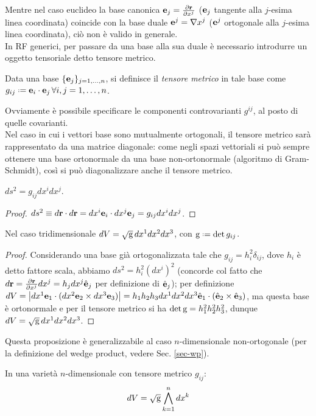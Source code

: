 Mentre nel caso euclideo la base canonica $ \mathbf{e}_j = \frac{\partial \mathbf{r}}{\partial x^j} $ ($ \mathbf{e}_j $ tangente alla $ j $-esima linea coordinata) coincide con la base duale $ \mathbf{e}^j = \nabla x^j $ ($ \mathbf{e}^j $ ortogonale alla $ j $-esima linea coordinata), ciò non è valido in generale.\\
In RF generici, per passare da una base alla sua duale è necessario introdurre un oggetto tensoriale detto tensore metrico.

\begin{definition}
	Data una base $ \{\mathbf{e}_j\}_{j=1,\dots,n} $, si definisce il \textit{tensore metrico} in tale base come $ g_{ij} \defeq \ve{e}_i \cdot \ve{e}_j \, \forall i,j = 1,\dots,n$.
\end{definition}

Ovviamente è possibile specificare le componenti controvarianti $ g^{ij} $, al posto di quelle covarianti. \\
Nel caso in cui i vettori base sono mutualmente ortogonali, il tensore metrico sarà rappresentato da una matrice diagonale: come negli spazi vettoriali si può sempre ottenere una base ortonormale da una base non-ortonormale (algoritmo di Gram-Schmidt), così si può diagonalizzare anche il tensore metrico.

\begin{proposition}
	$ ds^2 = g_{ij} dx^i dx^j $.
\end{proposition}
\begin{proof}
	$ ds^2 \equiv d\mathbf{r} \cdot d\mathbf{r} = dx^i \mathbf{e}_i \cdot dx^j \mathbf{e}_j = g_{ij} dx^i dx^j $.
\end{proof}

\begin{proposition}
	Nel caso tridimensionale $ dV = \sqrt{\mathrm{g}}\, dx^1 dx^2 dx^3 $, con $ \tens{g} \defeq \det g_{ij} $.
\end{proposition}
\begin{proof}
	Considerando una base già ortogonalizzata tale che $ g_{ij} = h_i^2 \delta_{ij} $, dove $ h_i $ è detto fattore scala, abbiamo $ ds^2 = h_i^2 (dx^i)^2 $ (concorde col fatto che $ d\mathbf{r} = \frac{\partial \mathbf{r}}{\partial x^j} dx^j = h_j dx^j \hat{\mathbf{e}}_j $ per definizione di $ \hat{\mathbf{e}}_j $); per definizione $ dV = \left\lvert dx^1\mathbf{e}_1 \cdot (dx^2\mathbf{e}_2 \times dx^3\mathbf{e}_3)\right\rvert = h_1 h_2 h_3 dx^1 dx^2 dx^3 \hat{\mathbf{e}}_1 \cdot (\hat{\mathbf{e}}_2 \times \hat{\mathbf{e}}_3) $, ma questa base è ortonormale e per il tensore metrico si ha $ \det\mathrm{g} = h_1^2 h_2^2 h_3^2 $, dunque $ dV = \sqrt{\mathrm{g}}\, dx^1 dx^2 dx^3 $.
\end{proof}
Questa proposizione è generalizzabile al caso $ n $-dimensionale non-ortogonale (per la definizione del wedge product, vedere Sec. \ref{sec-wp}).
\begin{proposition}
	In una varietà $ n $-dimensionale con tensore metrico $ g_{ij} $:
	\begin{equation}
		dV = \sqrt{\mathrm{g}} \displaystyle\bigwedge_{k = 1}^n dx^k
	\end{equation}
\end{proposition}

